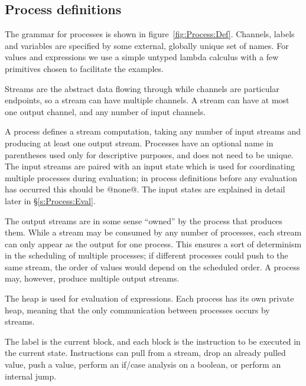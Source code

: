 \clearpage{}
\subsection{Process definitions}



The grammar for processes is shown in figure~\ref{fig:Process:Def}.
Channels, labels and variables are specified by some external, globally unique set of names.
For values and expressions we use a simple untyped lambda calculus with a few primitives chosen to facilitate the examples.

Streams are the abstract data flowing through while channels are particular endpoints, so a stream can have multiple channels.
A stream can have at most one output channel, and any number of input channels.

A process defines a stream computation, taking any number of input streams and producing at least one output stream.
Processes have an optional name in parentheses used only for descriptive purposes, and does not need to be unique.
The input streams are paired with an input state which is used for coordinating multiple processes during evaluation; in process definitions before any evaluation has occurred this should be @none@.
The input states are explained in detail later in \S\ref{s:Process:Eval}.

The output streams are in some sense ``owned'' by the process that produces them.
While a stream may be consumed by any number of processes, each stream can only appear as the output for one process.
This ensures a sort of determinism in the scheduling of multiple processes; if different processes could push to the same stream, the order of values would depend on the scheduled order.
A process may, however, produce multiple output streams.

The heap is used for evaluation of expressions.
Each process has its own private heap, meaning that the only communication between processes occurs by streams.

The label is the current block, and each block is the instruction to be executed in the current state.
Instructions can pull from a stream, drop an already pulled value, push a value, perform an if/case analysis on a boolean, or perform an internal jump.


